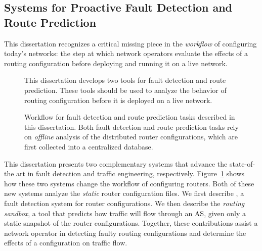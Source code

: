 \subsection{Systems for Proactive Fault Detection and Route Prediction}

This dissertation recognizes a critical missing piece in the {\em
workflow} of configuring today's networks: the step at which network
operators evaluate the effects of a routing configuration before
deploying and running it on a live network.


\begin{figure}[t]
\centering{}
\caption[This dissertation's contributions in fault detection and
route prediction.]{This dissertation develops two tools for fault detection
  and route prediction.  These tools should be used to analyze the
  behavior of routing configuration before it is deployed on a live
  network.}
\label{fig:intro:workflow2}
\end{figure}


\begin{figure}[t]
\centering{}
\caption[Workflow for fault detection and route prediction
  tasks.]{Workflow for fault detection and route prediction tasks 
  described in this dissertation. Both fault detection and route
  prediction tasks rely on {\em offline} analysis of the distributed 
  router configurations, which are first collected into a centralized
  database.}
\label{fig:intro:process}
\end{figure}


This dissertation presents two complementary systems that advance the
state-of-the art in fault detection and traffic engineering,
respectively.  Figure~\ref{fig:intro:workflow2} shows how these two
systems change the workflow of configuring routers.  Both of these new
systems analyze the {\em static} router configuration files.  We first
describe \rccns, a fault detection system for router configurations.  We
then describe the {\em routing sandbox}, a tool that predicts how traffic
will flow through an AS, given only a static snapshot of the router
configurations.  Together, these contributions assist a network operator
in detecting faulty routing configurations and determine the effects of
a configuration on traffic flow.

